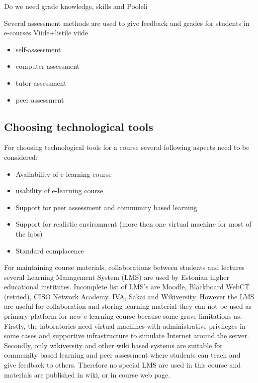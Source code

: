 Do we need grade knowledge, skills and {\color{red} Pooleli }

Several assessment methods are used to give feedback and grades for students in e-courses {\color{red} Viide+listile viide }

\begin{itemize}
	\item self-assessment
	\item computer assessment
	\item tutor assessment
	\item peer assessment
\end{itemize}
\subsection{Choosing technological tools}
For choosing technological tools for a course several following aspects need to be considered:

\begin{itemize}
	\item Availability of e-learning course
	\item usability of e-learning course
	\item Support for peer assessment and community based learning
	\item Support for realistic environment (more then one virtual machine for most of the labs)
	\item Standard complacence
\end{itemize}

For maintaining course materials, collaborations between students and lectures several Learning Management System (\gls{LMS}) are used by Estonian higher educational institutes. Incomplete list  of \gls{LMS}'s are Moodle, Blackboard WebCT (retried), CISO Network Academy, IVA, Sakai and Wikiversity. However the \gls{LMS} are useful for collaboration and storing learning material they can not be used as primary platform for new e-learning course because some grave limitations as: Firstly, the laboratories need virtual machines with administrative privileges in some cases  and supportive infrastructure to simulate Internet around the server. Secondly, only wikiversity and other wiki based systems are suitable for community based learning and peer assessment where students can teach and give feedback to others. Therefore no special \gls{LMS} are used in this course and materials are published in wiki, or in course web page. 






